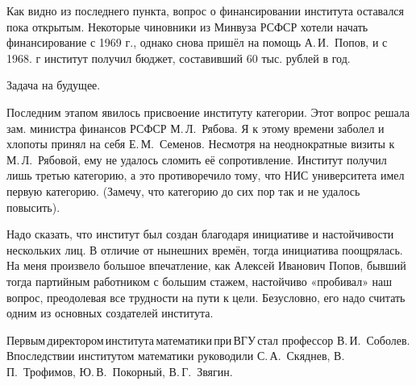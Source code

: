 Как видно из последнего пункта, вопрос о финансировании института оставался пока открытым. Некоторые чиновники из Минвуза РСФСР хотели начать финансирование с 1969 г., однако снова пришёл на помощь А.\,И.~Попов, и с 1968. г институт получил бюджет, составивший 60 тыс. рублей в год.

Задача  на  будущее.

Последним этапом явилось присвоение институту категории. Этот вопрос решала зам. министра финансов РСФСР М.\,Л.~Рябова. Я к этому времени заболел и хлопоты принял на себя Е.\,М.~Семенов. Несмотря на неоднократные визиты к М.\,Л.~Рябовой, ему не удалось сломить её сопротивление. Институт получил лишь третью категорию, а это противоречило тому, что НИС университета имел первую категорию. (Замечу, что категорию до сих пор так и не удалось повысить).

Надо сказать, что институт был создан благодаря инициативе и настойчивости нескольких лиц. В отличие от нынешних времён, тогда инициатива поощрялась. На меня \linebreak произвело большое впечатление, как Алексей Иванович Попов, бывший тогда партийным работником с большим стажем, настойчиво «пробивал» наш вопрос, преодолевая все трудности на пути к цели. Безусловно, его надо считать одним из основных создателей института.

Первым\,директором\,института\,математики\,при\,ВГУ\,стал \linebreak профессор В.\,И.~Соболев. Впоследствии институтом математики руководили С.\,А.~Скяднев, В.\,П.~Трофимов, Ю.\,В.~Покорный, В.\,Г.~Звягин.
